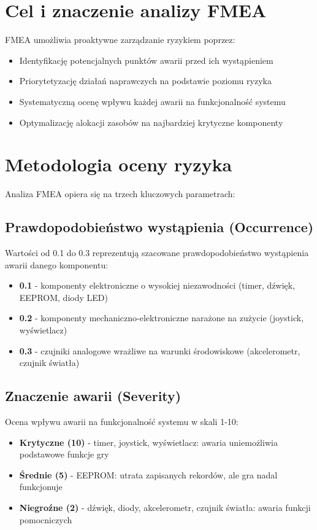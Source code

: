 \documentclass[letterpaper,11pt]{report}
\begin{document}
\section{Cel i znaczenie analizy FMEA}

FMEA umożliwia proaktywne zarządzanie ryzykiem poprzez:
\begin{itemize}
\item Identyfikację potencjalnych punktów awarii przed ich wystąpieniem
\item Priorytetyzację działań naprawczych na podstawie poziomu ryzyka
\item Systematyczną ocenę wpływu każdej awarii na funkcjonalność systemu
\item Optymalizację alokacji zasobów na najbardziej krytyczne komponenty
\end{itemize}

\section{Metodologia oceny ryzyka}

Analiza FMEA opiera się na trzech kluczowych parametrach:

\subsection{Prawdopodobieństwo wystąpienia (Occurrence)}
Wartości od 0.1 do 0.3 reprezentują szacowane prawdopodobieństwo wystąpienia awarii danego komponentu:
\begin{itemize}
\item \textbf{0.1} - komponenty elektroniczne o wysokiej niezawodności (timer, dźwięk, EEPROM, diody LED)
\item \textbf{0.2} - komponenty mechaniczno-elektroniczne narażone na zużycie (joystick, wyświetlacz)
\item \textbf{0.3} - czujniki analogowe wrażliwe na warunki środowiskowe (akcelerometr, czujnik światła)
\end{itemize}

\subsection{Znaczenie awarii (Severity)}
Ocena wpływu awarii na funkcjonalność systemu w skali 1-10:
\begin{itemize}
\item \textbf{Krytyczne (10)} - timer, joystick, wyświetlacz: awaria uniemożliwia podstawowe funkcje gry
\item \textbf{Średnie (5)} - EEPROM: utrata zapisanych rekordów, ale gra nadal funkcjonuje
\item \textbf{Niegroźne (2)} - dźwięk, diody, akcelerometr, czujnik światła: awaria funkcji pomocniczych
\end{itemize}
\end{document}
